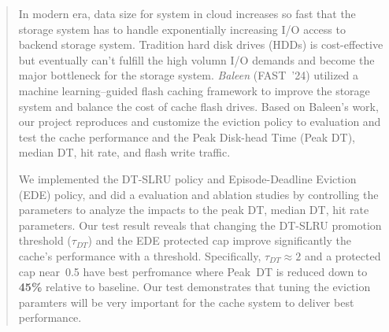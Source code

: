 \documentclass[sigconf]{acmart}
\begin{document}

\fi
\begin{abstract}
In modern era, data size for system in cloud increases so fast that the storage system has to handle exponentially increasing I/O access to backend storage system. Tradition hard disk drives (HDDs) is cost-effective but eventually can't fulfill the high volumn I/O demands and become the major bottleneck for the storage system. \textit{Baleen} (FAST~'24) utilized a machine learning–guided flash caching framework to improve the storage system and balance the cost of cache flash drives. Based on Baleen's work, our project reproduces and customize the eviction policy to evaluation and test the cache performance and the Peak Disk-head Time (Peak DT), median DT, hit rate, and flash write traffic. 

We implemented the DT-SLRU policy and Episode-Deadline Eviction (EDE) policy, and did a evaluation and ablation studies by controlling the parameters to analyze the impacts to the peak DT, median DT, hit rate parameters. Our test result reveals that changing the DT-SLRU promotion threshold ($\tau_{DT}$) and the EDE protected cap improve significantly the cache's performance with a threshold. Specifically, $\tau_{DT}\!\approx\!2$ and a protected cap near~0.5 have best perfromance where Peak~DT is reduced down to \textbf{45\%} relative to baseline. Our test demonstrates that tuning the eviction paramters will be very important for the cache system to deliver best performance.

\end{abstract}

\maketitle
\end{document}
